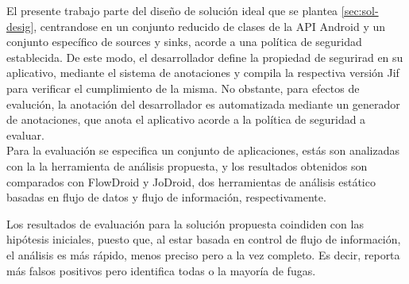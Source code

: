 El presente trabajo parte del diseño de solución ideal que se plantea
\ref{sec:sol-desig}, centrandose en un conjunto reducido de clases de la API
Android y un conjunto específico de sources y sinks, acorde a una política de
seguridad establecida.\newline 
De este modo, el desarrollador define la propiedad de segurirad en su
aplicativo, mediante el sistema de anotaciones y compila la respectiva versión
Jif para verificar el cumplimiento de la misma.\newline 
No obstante, para efectos de evalución, la anotación del desarrollador es
automatizada mediante un generador de anotaciones, que anota el aplicativo
acorde a la política de seguridad a evaluar.\\
Para la evaluación se especifica un conjunto de aplicaciones, estás son
analizadas con la la herramienta de análisis propuesta, y los resultados
obtenidos son comparados con FlowDroid y JoDroid, dos herramientas de análisis
estático basadas en flujo de datos y flujo de información, respectivamente.\newline

Los resultados de evaluación para la solución propuesta coindiden con las
hipótesis iniciales, puesto que, al estar basada en control de flujo de
información, el análisis es más rápido, menos preciso pero a la vez completo. Es
decir, reporta más falsos positivos pero identifica todas o la mayoría de fugas.

























